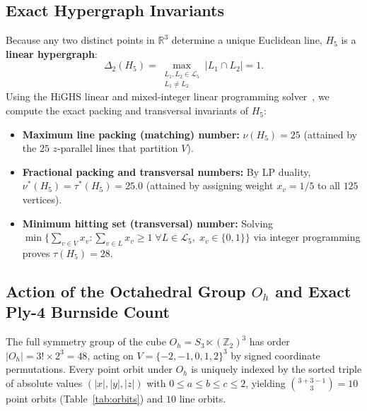 \documentclass[11pt,a4paper]{article}
\theoremstyle{definition}
\theoremstyle{remark}
\begin{document}
\subsection{Exact Hypergraph Invariants}
Because any two distinct points in $\mathbb{R}^3$ determine a unique Euclidean line, $H_5$ is a \textbf{linear hypergraph}:
\begin{equation}
    \Delta_2(H_5) = \max_{\substack{L_1, L_2 \in \mathcal{L}_5 \\ L_1 \neq L_2}} |L_1 \cap L_2| = 1.
\end{equation}
Using the HiGHS linear and mixed-integer linear programming solver~\cite{HuangfuHall2018}, we compute the exact packing and transversal invariants of $H_5$:
\begin{itemize}[noitemsep]
    \item \textbf{Maximum line packing (matching) number:} $\nu(H_5) = 25$ (attained by the $25$ $z$-parallel lines that partition $V$).
    \item \textbf{Fractional packing and transversal numbers:} By LP duality, $\nu^*(H_5) = \tau^*(H_5) = 25.0$ (attained by assigning weight $x_v = 1/5$ to all $125$ vertices).
    \item \textbf{Minimum hitting set (transversal) number:} Solving $\min \{\sum_{v \in V} x_v : \sum_{v \in L} x_v \ge 1 \; \forall L \in \mathcal{L}_5, \; x_v \in \{0,1\}\}$ via integer programming proves $\tau(H_5) = 28$.
\end{itemize}

\subsection{Action of the Octahedral Group $O_h$ and Exact Ply-4 Burnside Count}
The full symmetry group of the cube $O_h = S_3 \ltimes (\mathbb{Z}_2)^3$ has order $|O_h| = 3! \times 2^3 = 48$, acting on $V = \{-2,-1,0,1,2\}^3$ by signed coordinate permutations. Every point orbit under $O_h$ is uniquely indexed by the sorted triple of absolute values $(|x|, |y|, |z|)$ with $0 \le a \le b \le c \le 2$, yielding $\binom{3+3-1}{3} = 10$ point orbits (Table~\ref{tab:orbits}) and $10$ line orbits.
\end{document}
